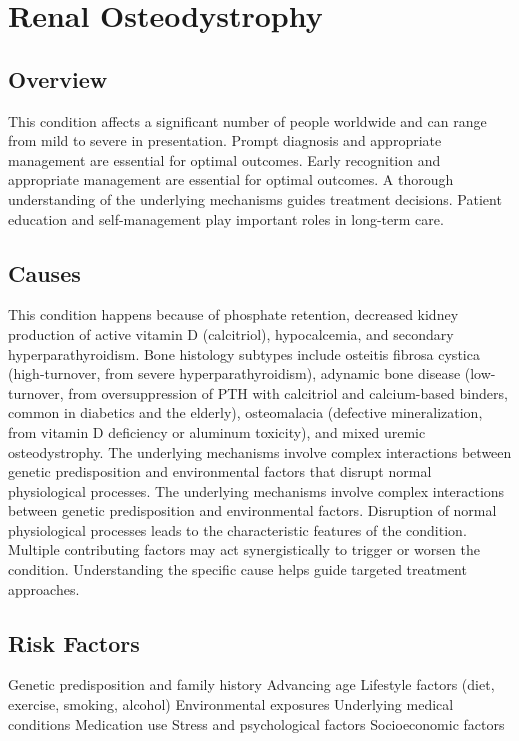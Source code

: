 \chapter{Renal Osteodystrophy}
\label{sec:Renal Osteodystrophy}

\section{Overview}
This condition affects a significant number of people worldwide and can range from mild to severe in presentation. Prompt diagnosis and appropriate management are essential for optimal outcomes. Early recognition and appropriate management are essential for optimal outcomes. A thorough understanding of the underlying mechanisms guides treatment decisions. Patient education and self-management play important roles in long-term care.
\section{Causes}
This condition happens because of phosphate retention, decreased kidney production of active vitamin D (calcitriol), hypocalcemia, and secondary hyperparathyroidism. Bone histology subtypes include osteitis fibrosa cystica (high-turnover, from severe hyperparathyroidism), adynamic bone disease (low-turnover, from oversuppression of PTH with calcitriol and calcium-based binders, common in diabetics and the elderly), osteomalacia (defective mineralization, from vitamin D deficiency or aluminum toxicity), and mixed uremic osteodystrophy. The underlying mechanisms involve complex interactions between genetic predisposition and environmental factors that disrupt normal physiological processes. The underlying mechanisms involve complex interactions between genetic predisposition and environmental factors. Disruption of normal physiological processes leads to the characteristic features of the condition. Multiple contributing factors may act synergistically to trigger or worsen the condition. Understanding the specific cause helps guide targeted treatment approaches.
\section{Risk Factors}
Genetic predisposition and family history Advancing age Lifestyle factors (diet, exercise, smoking, alcohol) Environmental exposures Underlying medical conditions Medication use Stress and psychological factors Socioeconomic factors

